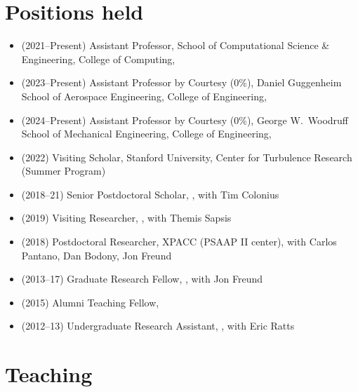 \section{Positions held}

\begin{itemize}
    \item (2021--Present) Assistant Professor, School of Computational Science \& Engineering, College of Computing, \GIT
    \item (2023--Present) Assistant Professor by Courtesy (0\%), Daniel Guggenheim School of Aerospace Engineering, College of Engineering, \GIT
    \item (2024--Present) Assistant Professor by Courtesy (0\%), George W.\ Woodruff School of Mechanical Engineering, College of Engineering, \GIT
    \item (2022) Visiting Scholar, Stanford University, Center for Turbulence Research (Summer Program)
    \item (2018--21) Senior Postdoctoral Scholar, \CIT, with Tim Colonius
    \item (2019) Visiting Researcher, \MIT, with Themis Sapsis
    \item (2018) Postdoctoral Researcher, XPACC (PSAAP II center), with Carlos Pantano, Dan Bodony, Jon Freund
    \item (2013--17) Graduate Research Fellow, \UIUC, with Jon Freund
    \item (2015) Alumni Teaching Fellow, \UIUC
    \item (2012--13) Undergraduate Research Assistant, \UMD, with Eric Ratts
\end{itemize}

\section{Teaching}

\subsection{\GIT}

